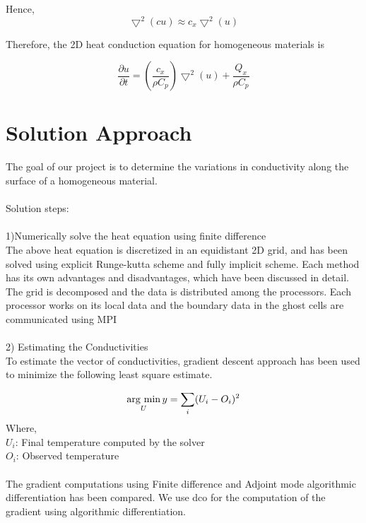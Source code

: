 \documentclass[10pt,a4paper]{report}
\newcommand{\argmin}{\mathop{\rm arg~min}\limits}
\begin{document}
Hence,
\begin{equation}
\bigtriangledown^2(cu) \approx c_x \bigtriangledown^2(u)
\end{equation}

Therefore, the 2D heat conduction equation for homogeneous materials is 

\begin{equation}
\frac{\partial u}{\partial t}=(\frac{c_x}{\rho C_p})\bigtriangledown^2(u)+\frac{Q_x}{\rho C_p}
\end{equation}

\section{Solution Approach}
The goal of our project is to determine the variations in conductivity along the surface of a homogeneous material.\\
\\
Solution steps:\\
\\
1)Numerically solve the heat equation using finite difference\\
The above heat equation is discretized in an equidistant 2D grid, and has been solved using explicit Runge-kutta scheme and fully implicit scheme. Each method has its own advantages and disadvantages, which have been discussed in detail. The grid is decomposed and the data is distributed among the processors. Each processor works on its local data and the boundary data in the ghost cells are communicated using MPI \\
\\
2) Estimating the Conductivities\\
To estimate the vector of conductivities, gradient descent approach has been used to minimize the following least square estimate.

\begin{equation}
\argmin_{\substack{U}} y= \sum_{\substack{i}}(U_i-O_i)^2
\end{equation}
Where,\\
$U_i$: Final temperature computed by the solver\\
$O_i$: Observed temperature\\
\\
The gradient computations using Finite difference and Adjoint mode algorithmic differentiation has been compared. We use dco for the computation of the gradient using algorithmic differentiation.
\end{document}

